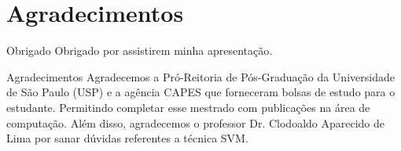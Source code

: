 \section{Agradecimentos}

\begin{frame}
	\begin{block}{Obrigado}
		Obrigado por assistirem minha apresentação.
	\end{block}
\end{frame}

\begin{frame}
	\begin{block}{Agradecimentos}
		Agradecemos a Pró-Reitoria de Pós-Graduação da Universidade de São Paulo (USP) e a agência CAPES que forneceram bolsas de estudo para o estudante. Permitindo completar esse mestrado com publicações na área de computação. Além disso, agradecemos o professor Dr. Clodoaldo Aparecido de Lima por sanar dúvidas referentes a técnica SVM.
	\end{block}
\end{frame}